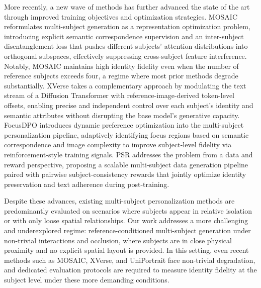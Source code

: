 \documentclass{article}
\begin{document}
More recently, a new wave of methods has further advanced the state of the art through improved training objectives and optimization strategies. MOSAIC \cite{she2025mosaic} reformulates multi-subject generation as a representation optimization problem, introducing explicit semantic correspondence supervision and an inter-subject disentanglement loss that pushes different subjects' attention distributions into orthogonal subspaces, effectively suppressing cross-subject feature interference. Notably, MOSAIC maintains high identity fidelity even when the number of reference subjects exceeds four, a regime where most prior methods degrade substantially. XVerse \cite{chen2025xverse} takes a complementary approach by modulating the text stream of a Diffusion Transformer with reference-image-derived token-level offsets, enabling precise and independent control over each subject's identity and semantic attributes without disrupting the base model's generative capacity. FocusDPO \cite{jin2025focusdpo} introduces dynamic preference optimization into the multi-subject personalization pipeline, adaptively identifying focus regions based on semantic correspondence and image complexity to improve subject-level fidelity via reinforcement-style training signals. PSR \cite{wang2025psr} addresses the problem from a data and reward perspective, proposing a scalable multi-subject data generation pipeline paired with pairwise subject-consistency rewards that jointly optimize identity preservation and text adherence during post-training.

Despite these advances, existing multi-subject personalization methods are predominantly evaluated on scenarios where subjects appear in relative isolation or with only loose spatial relationships. Our work addresses a more challenging and underexplored regime: reference-conditioned multi-subject generation under non-trivial interactions and occlusion, where subjects are in close physical proximity and no explicit spatial layout is provided. In this setting, even recent methods such as MOSAIC, XVerse, and UniPortrait face non-trivial degradation, and dedicated evaluation protocols are required to measure identity fidelity at the subject level under these more demanding conditions.
\end{document}
